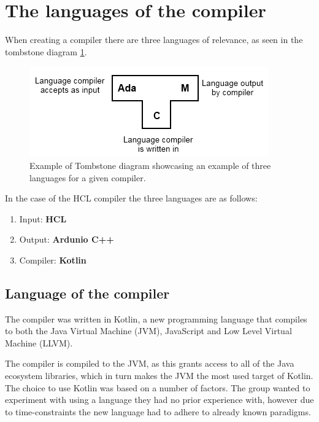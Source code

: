 \section{The languages of the compiler}
\label{langsOfCompiler}
When creating a compiler there are three languages of relevance, as seen in the tombstone diagram \ref{fig:TStoneExample}.

\begin{figure}[H]
	\centering
	\includegraphics[width=\textwidth/2+\textwidth/4]{4.Solution/images/T-diagram.png}
	\caption{
		Example of Tombstone diagram showcasing an example of three languages for a given compiler\cite{TStoneWiki}.
	}
	\label{fig:TStoneExample}
\end{figure}
In the case of the HCL compiler the three languages are as follows:

\begin{enumerate}
\item Input: \textbf{HCL} \\
\item Output: \textbf{Ardunio C++} \\
\item Compiler: \textbf{Kotlin} \\
\end{enumerate}

\subsection{Language of the compiler}
The compiler was written in Kotlin\cite{KotlinWebsite}, a new programming language that compiles to both the Java Virtual Machine (JVM), JavaScript and Low Level Virtual Machine (LLVM).

The compiler is compiled to the JVM, as this grants access to all of the Java ecosystem libraries, which in turn makes the JVM the most used target of Kotlin.
The choice to use Kotlin was based on a number of factors.
The group wanted to experiment with using a language they had no prior experience with, however due to time-constraints the new language had to adhere to already known paradigms.

